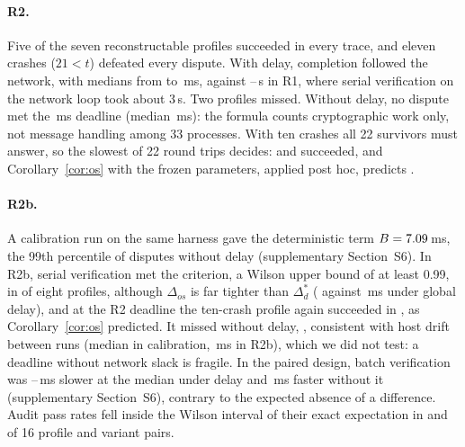 \documentclass[Crown,sagev]{sagej}
\theoremstyle{plain}
\theoremstyle{definition}
\theoremstyle{remark}
\begin{document}
\paragraph{R2.} Five of the seven reconstructable profiles succeeded in every trace, and eleven crashes ($21<t$) defeated every dispute. With delay, completion followed the network, with medians from \RtwoMedLo{} to \RtwoMedHi\,ms, against \RDLMedLo--\RDLMedHi\,s in R1, where serial verification on the network loop took about 3\,s. Two profiles missed. Without delay, no dispute met the \RtwoControlDstar\,ms deadline (median \RtwoControlMed\,ms): the formula counts cryptographic work only, not message handling among 33 processes. With ten crashes all 22 survivors must answer, so the slowest of 22 round trips decides: \RtwoCrashTenSerial{} and \RtwoCrashTenBatch{} succeeded, and Corollary~\ref{cor:os} with the frozen parameters, applied post hoc, predicts \RtwoDfourPred.

\paragraph{R2b.} A calibration run on the same harness gave the deterministic term $B=7.09$\,ms, the 99th percentile of disputes without delay (supplementary Section~S6). In R2b, serial verification met the criterion, a Wilson upper bound of at least 0.99, in \RtwobMeets{} of eight profiles, although $\Delta_{os}$ is far tighter than $\Delta_d^{*}$ (\RtwobOsGlobal{} against \RtwoGlobalDstar\,ms under global delay), and at the R2 deadline the ten-crash profile again succeeded in \RtwobDfourAtDstar, as Corollary~\ref{cor:os} predicted. It missed without delay, \RtwobControlRate{} \RtwobControlWilson, consistent with host drift between runs (median \RtwobCalibMed{} in calibration, \RtwobControlMed\,ms in R2b), which we did not test: a deadline without network slack is fragile. In the paired design, batch verification was \RtwobBatchSlowLo--\RtwobBatchSlowHi\,ms slower at the median under delay and \RtwobBatchFastZero\,ms faster without it (supplementary Section~S6), contrary to the expected absence of a difference. Audit pass rates fell inside the Wilson interval of their exact expectation in \RtwoAuditInside{} and \RtwobAuditInside{} of 16 profile and variant pairs.

\begin{table}[t]
\caption{Emulated testbed: 32 custodian processes on one host, ristretto255 and TDH2, \RtwoTraces{} traces per profile, variant and run. Success requires the correct plaintext by the run's deadline: $\Delta_d^{*}$ for R2, $\Delta_{os}$ (Corollary~\ref{cor:os}, calibrated $B$) for R2b, each fixed before its run; R2b serial with 95\% Wilson interval; medians over R2b serial disputes that succeeded; R1 is the first prototype (ffdhe2048).}
\label{tab:testbed}
\centering
\scriptsize
\setlength{\tabcolsep}{2.5pt}

\end{table}
\end{document}
